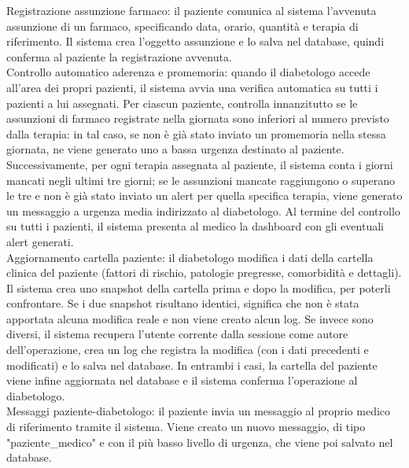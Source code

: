Registrazione assunzione farmaco: il paziente comunica al sistema l'avvenuta assunzione di un farmaco, specificando data, orario, quantità e terapia di riferimento. Il sistema crea l'oggetto assunzione e lo salva nel database, quindi conferma al paziente la registrazione avvenuta.\\

Controllo automatico aderenza e promemoria: quando il diabetologo accede all'area dei propri pazienti, il sistema avvia una verifica automatica su tutti i pazienti a lui assegnati. Per ciascun paziente, controlla innanzitutto se le assunzioni di farmaco registrate nella giornata sono inferiori al numero previsto dalla terapia: in tal caso, se non è già stato inviato un promemoria nella stessa giornata, ne viene generato uno a bassa urgenza destinato al paziente. Successivamente, per ogni terapia assegnata al paziente, il sistema conta i giorni mancati negli ultimi tre giorni; se le assunzioni mancate raggiungono o superano le tre e non è già stato inviato un alert per quella specifica terapia, viene generato un messaggio a urgenza media indirizzato al diabetologo. Al termine del controllo su tutti i pazienti, il sistema presenta al medico la dashboard con gli eventuali alert generati.\\

Aggiornamento cartella paziente: il diabetologo modifica i dati della cartella clinica del paziente (fattori di rischio, patologie pregresse, comorbidità e dettagli). Il sistema crea uno snapshot della cartella prima e dopo la modifica, per poterli confrontare. Se i due snapshot risultano identici, significa che non è stata apportata alcuna modifica reale e non viene creato alcun log. Se invece sono diversi, il sistema recupera l'utente corrente dalla sessione come autore dell'operazione, crea un log che registra la modifica (con i dati precedenti e modificati) e lo salva nel database. In entrambi i casi, la cartella del paziente viene infine aggiornata nel database e il sistema conferma l'operazione al diabetologo.\\

Messaggi paziente-diabetologo: il paziente invia un messaggio al proprio medico di riferimento tramite il sistema. Viene creato un nuovo messaggio, di tipo "paziente\_medico" e con il più basso livello di urgenza, che viene poi salvato nel database.\\

